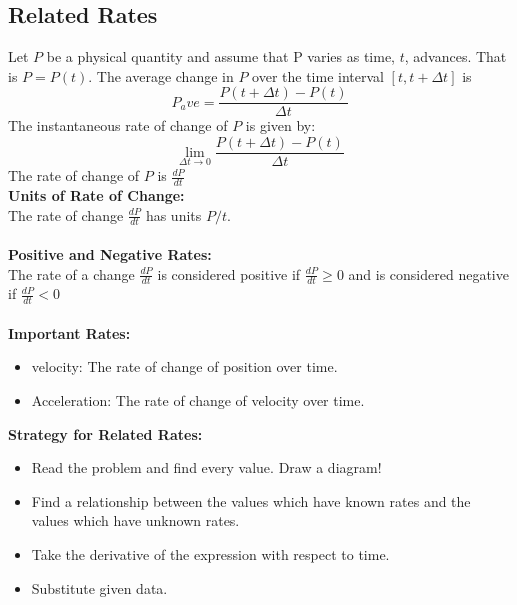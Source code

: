 \documentclass[14pt]{article}
\begin{document}
    \subsection{Related Rates}
    Let $P$ be a physical quantity and assume that P varies as time,
    $t$, advances. That is $P=P(t)$. The average change in $P$ over the
    time interval $[t, t+\Delta t]$ is 
    $$P_ave=\frac{P(t+\Delta t)-P(t)}{\Delta t}$$ The instantaneous rate
    of change of $P$ is given by:
    $$\lim \limits_{\Delta t \rightarrow 0} \frac{P(t+\Delta
    t)-P(t)}{\Delta t}$$ The rate of change of $P$ is $\frac{dP}{dt}$\\
    \textbf{Units of Rate of Change:}\\
    The rate of change $\frac{dP}{dt}$ has units $P/t$.\\\\
    \textbf{Positive and Negative Rates:}\\
    The rate of a change $\frac{dP}{dt}$ is considered positive if
    $\frac{dP}{dt}\geq0$ and is considered negative if
    $\frac{dP}{dt}<0$\\\\
    \textbf{Important Rates:}\\
    \begin{itemize}
        \item velocity: The rate of change of position over time.
        \item Acceleration: The rate of change of velocity over time.
    \end{itemize}
    \textbf{Strategy for Related Rates:}\\
    \begin{itemize}
        \item Read the problem and find every value. Draw a diagram!
        \item Find a relationship between the values which have known
        rates and the values which have unknown rates.
        \item Take the derivative of the expression with respect to
        time.
        \item Substitute given data.
    \end{itemize}
\end{document}
